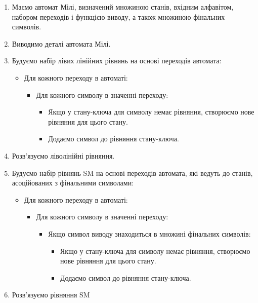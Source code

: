 \documentclass[12pt,a4paper]{article}
\begin{document}
\begin{enumerate}
        \item Маємо автомат Мілі, визначений множиною станів, вхідним алфавітом, набором переходів і функцією виводу, а також множиною фінальних символів.
        \item Виводимо деталі автомата Мілі.
        \item Будуємо набір лівих лінійних рівнянь на основі переходів автомата:
        \begin{itemize}
            \item Для кожного переходу в автоматі:
            \begin{itemize}
                \item Для кожного символу в значенні переходу:
                \begin{itemize}
                    \item Якщо у стану-ключа для символу немає рівняння, створюємо нове рівняння для цього стану.
                    \item Додаємо символ до рівняння стану-ключа.
                \end{itemize}
            \end{itemize}
        \end{itemize}
        \item Розв'язуємо ліволінійні рівняння.
        \item Будуємо набір рівнянь SM на основі переходів автомата, які ведуть до станів, асоційованих з фінальними символами:
        \begin{itemize}
            \item Для кожного переходу в автоматі:
            \begin{itemize}
                \item Для кожного символу в значенні переходу:
                \begin{itemize}
                    \item Якщо символ виводу знаходиться в множині фінальних символів:
                    \begin{itemize}
                        \item Якщо у стану-ключа для символу немає рівняння, створюємо нове рівняння для цього стану.
                        \item Додаємо символ до рівняння стану-ключа.
                    \end{itemize}
                \end{itemize}
            \end{itemize}
        \end{itemize}
        \item Розв'язуємо рівняння SM
\end{enumerate}
\end{document}
